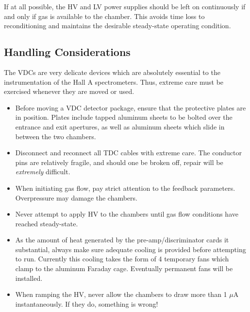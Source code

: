 \documentclass[12pt]{article}
\begin{document}
If at all possible, the HV and LV power supplies should be left
on continuously if and only if gas is available to the chamber.  This
avoids time loss to reconditioning and maintains the desirable
steady-state operating condition.

\subsection{Handling Considerations}

The VDCs are very delicate devices which are absolutely essential to
the instrumentation of the Hall A spectrometers.  Thus, extreme care
must be exercised whenever they are moved or used.

\begin{itemize}
\item{Before moving a VDC detector package, ensure that the protective
plates are in position.  Plates include tapped aluminum sheets to
be bolted over the entrance and exit apertures, as well as aluminum
sheets which slide in between the two chambers.}
\item{Disconnect and reconnect all TDC cables with extreme care.  The
conductor pins are relatively fragile, and should one be broken off,
repair will be {\it extremely} difficult.}
\item{When initiating gas flow, pay strict attention to the feedback
parameters.  Overpressure may damage the chambers.}
\item{Never attempt to apply HV to the chambers until gas flow
conditions have reached steady-state.}
\item{As the amount of heat generated by the pre-amp/discriminator
cards it substantial, always make sure adequate cooling is provided
before attempting to run.  Currently this cooling takes the form of
4 temporary fans which clamp to the aluminum Faraday cage.  Eventually
permanent fans will be installed.}
\item{When ramping the HV, never allow the chambers to draw more than
1 $\mu$A instantaneously.  If they do, something is wrong!}
\end{itemize}
\end{document}
